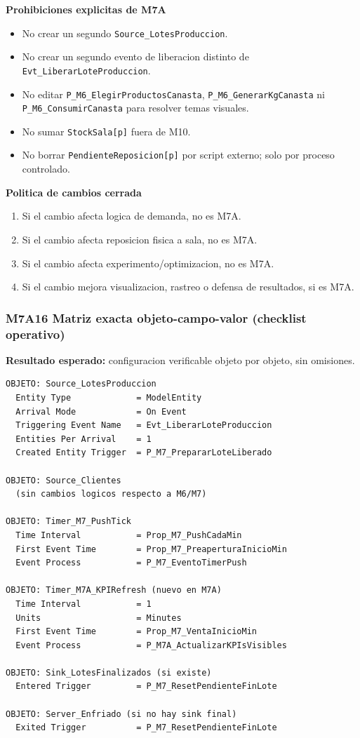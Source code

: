 \documentclass[11pt]{article}
\newcommand{\simio}[1]{\texttt{#1}}
\newcommand{\state}[1]{\texttt{#1}}
\newcommand{\proc}[1]{\texttt{#1}}
\begin{document}
\textbf{Prohibiciones explicitas de M7A}
\begin{itemize}
  \item No crear un segundo \simio{Source\_LotesProduccion}.
  \item No crear un segundo evento de liberacion distinto de \simio{Evt\_LiberarLoteProduccion}.
  \item No editar \proc{P\_M6\_ElegirProductosCanasta}, \proc{P\_M6\_GenerarKgCanasta} ni \proc{P\_M6\_ConsumirCanasta} para resolver temas visuales.
  \item No sumar \state{StockSala[p]} fuera de M10.
  \item No borrar \state{PendienteReposicion[p]} por script externo; solo por proceso controlado.
\end{itemize}

\textbf{Politica de cambios cerrada}
\begin{enumerate}
  \item Si el cambio afecta logica de demanda, no es M7A.
  \item Si el cambio afecta reposicion fisica a sala, no es M7A.
  \item Si el cambio afecta experimento/optimizacion, no es M7A.
  \item Si el cambio mejora visualizacion, rastreo o defensa de resultados, si es M7A.
\end{enumerate}

\subsubsection{M7A16 Matriz exacta objeto-campo-valor (checklist operativo)}
\textbf{Resultado esperado:} configuracion verificable objeto por objeto, sin omisiones.

\begin{lstlisting}[caption={Matriz cerrada de configuracion M7A}]
OBJETO: Source_LotesProduccion
  Entity Type             = ModelEntity
  Arrival Mode            = On Event
  Triggering Event Name   = Evt_LiberarLoteProduccion
  Entities Per Arrival    = 1
  Created Entity Trigger  = P_M7_PrepararLoteLiberado

OBJETO: Source_Clientes
  (sin cambios logicos respecto a M6/M7)

OBJETO: Timer_M7_PushTick
  Time Interval           = Prop_M7_PushCadaMin
  First Event Time        = Prop_M7_PreaperturaInicioMin
  Event Process           = P_M7_EventoTimerPush

OBJETO: Timer_M7A_KPIRefresh (nuevo en M7A)
  Time Interval           = 1
  Units                   = Minutes
  First Event Time        = Prop_M7_VentaInicioMin
  Event Process           = P_M7A_ActualizarKPIsVisibles

OBJETO: Sink_LotesFinalizados (si existe)
  Entered Trigger         = P_M7_ResetPendienteFinLote

OBJETO: Server_Enfriado (si no hay sink final)
  Exited Trigger          = P_M7_ResetPendienteFinLote
\end{lstlisting}
\end{document}
